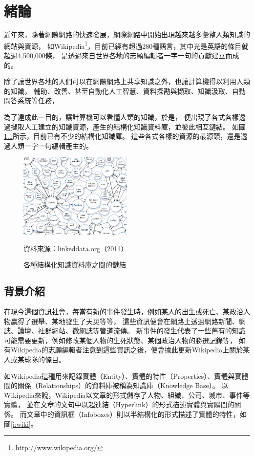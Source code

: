 %
%
%
\chapter{緒論}
\label{c:intro}

近年來，隨著網際網路的快速發展，網際網路中開始出現越來越多彙整人類知識的網站與資源，
如Wikipedia\footnote{http://www.wikipedia.org/}，目前已經有超過280種語言，其中光是英語的條目就超過4,500,000條，
是透過來自世界各地的志願編輯者一字一句的貢獻建立而成的。

除了讓世界各地的人們可以在網際網路上共享知識之外，也讓計算機得以利用人類的知識，
輔助、改善、甚至自動化人工智慧、資料探勘與擷取、知識汲取、自動問答系統等任務，

為了達成此一目的，讓計算機可以看懂人類的知識，於是，
便出現了各式各樣透過擷取人工建立的知識資源，產生的結構化知識資料庫，並彼此相互鏈結。
如圖\ref{i:lod}所示，目前已有不少的結構化知識庫。
這些各式各樣的資源的最源頭，還是透過人類一字一句編輯產生的。%

\begin{figure}
\centering
\includegraphics[width=0.5\textwidth]{images/01-lod-datasets}
\caption{各種結構化知識資料庫之間的鏈結}
\label{i:lod}
資料來源：linkeddata.org（2011）
\end{figure}

%
%
\section{背景介紹}
在現今這個資訊社會，每當有新的事件發生時，例如某人的出生或死亡、某政治人物贏得了選舉、某地發生了天災等等，
這些資訊便會在網路上透過網路新聞、網誌、論壇、社群網站、微網誌等管道流傳。
新事件的發生代表了一些舊有的知識可能需要更新，例如修改某個人物的生死狀態、某個政治人物的勝選記錄等，
如有Wikipedia的志願編輯者注意到這些資訊之後，便會據此更新Wikipedia上關於某人或某球隊的條目。

如Wikipedia這種用來記錄實體（Entity）、實體的特性（Properties）、實體與實體間的關係（Relationships）的資料庫被稱為知識庫（Knowledge Base）。
以Wikipedia來說，Wikipedia以文章的形式儲存了人物、組織、公司、城市、事件等實體，
並在文章的文句中以超連結（Hyperlink）的形式描述實體與實體間的關係。
而文章中的資訊框（Infoboxes）則以半結構化的形式描述了實體的特性，如圖\ref{i:wiki}。

